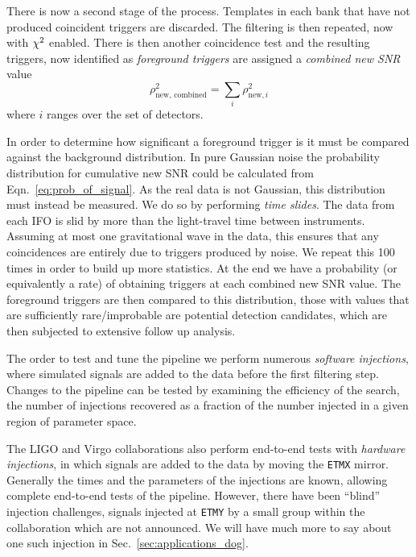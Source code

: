 There is now a second stage of the process.  Templates in each bank
that have not produced coincident triggers are discarded.  The
filtering is then repeated, now with $\chi^2$ enabled.  There is then
another coincidence test and the resulting triggers, now identified as
\emph{foreground triggers} are assigned a \emph{combined new SNR}
value
%
\begin{equation*}
\rho_{\textrm{new, combined}}^2 = \sum_i \rho_{\textrm{new}, i}^2
\end{equation*}
%
where $i$ ranges over the set of detectors.

In order to determine how significant a foreground trigger is it must
be compared against the background distribution.  In pure Gaussian
noise the probability distribution for cumulative new SNR could be
calculated from Eqn.~\ref{eq:prob_of_signal}.  As the real data is
not Gaussian, this distribution must instead be measured.  We do so by
performing \emph{time slides}.  The data from each IFO is slid by more
than the light-travel time between instruments.  Assuming at most one
gravitational wave in the data, this ensures that any coincidences are
entirely due to triggers produced by noise.  We repeat this 100 times
in order to build up more statistics.  At the end we have a
probability (or equivalently a rate) of obtaining triggers at each
combined new SNR value.  The foreground triggers are then compared to
this distribution, those with values that are sufficiently
rare/improbable are potential detection candidates, which are then
subjected to extensive follow up analysis.

The order to test and tune the pipeline we perform numerous
\emph{software injections}, where simulated signals are added to the
data before the first filtering step.  Changes to the pipeline can be
tested by examining the efficiency of the search, the number of
injections recovered as a fraction of the number injected in a given
region of parameter space.

The LIGO and Virgo collaborations also perform end-to-end tests with
\emph{hardware injections}, in which signals are added to the data by
moving the \texttt{ETMX} mirror.  Generally the times and the
parameters of the injections are known, allowing complete end-to-end
tests of the pipeline.  However, there have been ``blind'' injection
challenges, signals injected at \texttt{ETMY} by a small group within
the collaboration which are not announced.  We will have much more to
say about one such injection in Sec.~\ref{sec:applications_dog}.

